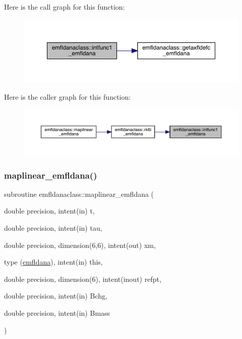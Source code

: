 Here is the call graph for this function\+:\nopagebreak
\begin{figure}[H]
\begin{center}
\leavevmode
\includegraphics[width=350pt]{namespaceemfldanaclass_aeab0c2abbaa5f527784ce7006d3b4d58_cgraph}
\end{center}
\end{figure}
Here is the caller graph for this function\+:\nopagebreak
\begin{figure}[H]
\begin{center}
\leavevmode
\includegraphics[width=350pt]{namespaceemfldanaclass_aeab0c2abbaa5f527784ce7006d3b4d58_icgraph}
\end{center}
\end{figure}
\mbox{\label{namespaceemfldanaclass_aabcc1ab7e5ac19f07fba4e38cfe24b04}} 
\subsubsection{\texorpdfstring{maplinear\_emfldana()}{maplinear\_emfldana()}}
{\footnotesize\ttfamily subroutine emfldanaclass\+::maplinear\+\_\+emfldana (\begin{DoxyParamCaption}\item[{double precision, intent(in)}]{t,  }\item[{double precision, intent(in)}]{tau,  }\item[{double precision, dimension(6,6), intent(out)}]{xm,  }\item[{type (\mbox{\hyperlink{namespaceemfldanaclass_structemfldanaclass_1_1emfldana}{emfldana}}), intent(in)}]{this,  }\item[{double precision, dimension(6), intent(inout)}]{refpt,  }\item[{double precision, intent(in)}]{Bchg,  }\item[{double precision, intent(in)}]{Bmass }\end{DoxyParamCaption})}

